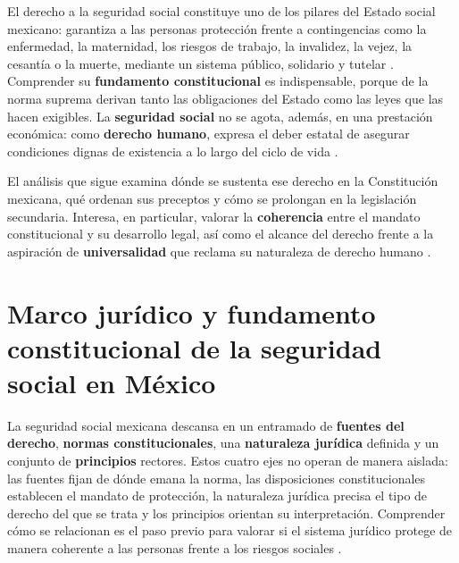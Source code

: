 \documentclass[12pt,letterpaper,oneside]{article}
\begin{document}
El derecho a la seguridad social constituye uno de los pilares del Estado social mexicano: garantiza a las personas protecci\'on frente a contingencias como la enfermedad, la maternidad, los riesgos de trabajo, la invalidez, la vejez, la cesant\'ia o la muerte, mediante un sistema p\'ublico, solidario y tutelar \citep{bricenoRuiz2011}. Comprender su \textbf{fundamento constitucional} es indispensable, porque de la norma suprema derivan tanto las obligaciones del Estado como las leyes que las hacen exigibles. La \textbf{seguridad social} no se agota, adem\'as, en una prestaci\'on econ\'omica: como \textbf{derecho humano}, expresa el deber estatal de asegurar condiciones dignas de existencia a lo largo del ciclo de vida \citep{belmontLugoParra2017,acnudhSeguridadSocial2026}.

El an\'alisis que sigue examina d\'onde se sustenta ese derecho en la Constituci\'on mexicana, qu\'e ordenan sus preceptos y c\'omo se prolongan en la legislaci\'on secundaria. Interesa, en particular, valorar la \textbf{coherencia} entre el mandato constitucional y su desarrollo legal, as\'i como el alcance del derecho frente a la aspiraci\'on de \textbf{universalidad} que reclama su naturaleza de derecho humano \citep{cpeum2026,ibarraOlguin2022}.

\section{Marco jur\'idico y fundamento constitucional de la seguridad social en M\'exico}

La seguridad social mexicana descansa en un entramado de \textbf{fuentes del derecho}, \textbf{normas constitucionales}, una \textbf{naturaleza jur\'idica} definida y un conjunto de \textbf{principios} rectores. Estos cuatro ejes no operan de manera aislada: las fuentes fijan de d\'onde emana la norma, las disposiciones constitucionales establecen el mandato de protecci\'on, la naturaleza jur\'idica precisa el tipo de derecho del que se trata y los principios orientan su interpretaci\'on. Comprender c\'omo se relacionan es el paso previo para valorar si el sistema jur\'idico protege de manera coherente a las personas frente a los riesgos sociales \citep{bricenoRuiz2011,belmontLugoParra2017}.
\end{document}
